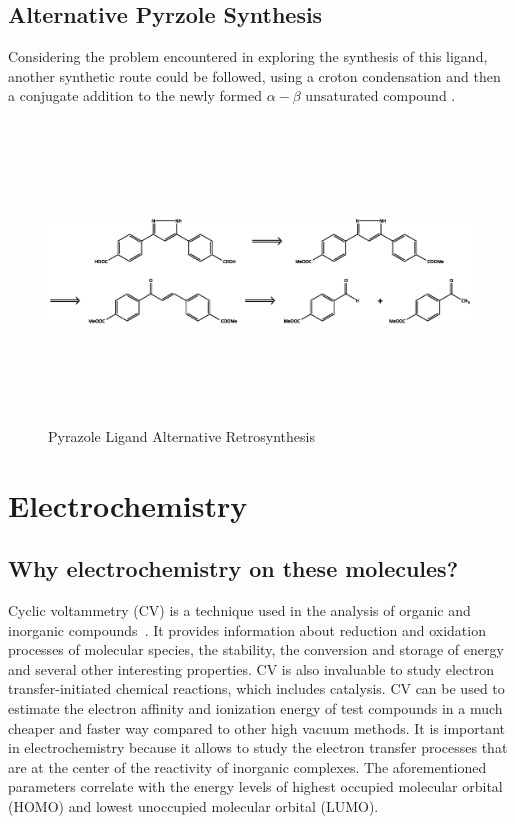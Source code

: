 \documentclass[../Master.tex]{subfiles}
\begin{document}
\subsection{Alternative Pyrzole Synthesis}\label{sec:alt-pyrazole-synthe}

Considering the problem encountered in exploring the synthesis of this ligand, another synthetic route could be followed, using a croton condensation and then a conjugate addition to the newly formed \(\alpha-\beta\) unsaturated compound \cite{cinar_synthesis_2021}.

\begin{figure}[h!]
	\centering
	\includegraphics[width=16cm,height=8cm,keepaspectratio]{Structures/pyrazole-retro-alt.eps}
	\caption{Pyrazole Ligand Alternative Retrosynthesis}\label{fig:pyrazole-retro-alt}
\end{figure}

\section{Electrochemistry}\label{sec:electrochemistry}

\subsection{Why electrochemistry on these molecules?}\label{sec:elect-intro}

Cyclic voltammetry (CV) is a technique used in the analysis of organic and inorganic compounds\ \cite{elgrishi_practical_2018}. It provides information about reduction and oxidation processes of molecular species, the stability, the conversion and storage of energy and several other interesting properties. CV is also invaluable to study electron transfer-initiated chemical reactions, which includes catalysis. CV can be used to estimate the electron affinity and ionization energy of test compounds in a much cheaper and faster way compared to other high vacuum methods. It is important in electrochemistry because it allows to study the electron transfer processes that are at the center of the reactivity of inorganic complexes.
The aforementioned parameters correlate with the energy levels of highest occupied molecular orbital (HOMO) and lowest unoccupied molecular orbital (LUMO).
\end{document}
